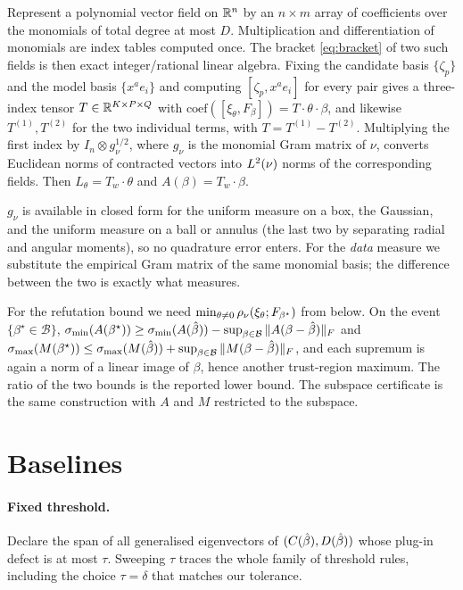 Represent a polynomial vector field on $\mathbb{R}^n$ by an $n \times m$ array of
coefficients over the monomials of total degree at most $D$. Multiplication and
differentiation of monomials are index tables computed once. The bracket
\eqref{eq:bracket} of two such fields is then exact integer/rational linear
algebra. Fixing the candidate basis $\{\zeta_p\}$ and the model basis
$\{x^a e_i\}$ and computing $[\zeta_p, x^a e_i]$ for every pair gives a
three-index tensor $T \in \mathbb{R}^{K \times P \times Q}$ with
$\mathrm{coef}([\xi_\theta,F_\beta]) = T \cdot \theta \cdot \beta$, and likewise
$T^{(1)}, T^{(2)}$ for the two individual terms, with $T = T^{(1)}-T^{(2)}$.
Multiplying the first index by $I_n \otimes g_\nu^{1/2}$, where $g_\nu$ is the
monomial Gram matrix of $\nu$, converts Euclidean norms of contracted vectors
into $L^2(\nu)$ norms of the corresponding fields. Then
$L_\theta = T_w \cdot \theta$ and $A(\beta) = T_w \cdot \beta$.

$g_\nu$ is available in closed form for the uniform measure on a box, the
Gaussian, and the uniform measure on a ball or annulus (the last two by
separating radial and angular moments), so no quadrature error enters. For the
\emph{data} measure we substitute the empirical Gram matrix of the same monomial
basis; the difference between the two is exactly what 
measures.

For the refutation bound we need
$\min_{\theta \ne 0}\rho_\nu(\xi_\theta;F_{\beta^\star})$ from below.
On the event $\{\beta^\star \in \mathcal B\}$,
$\sigma_{\min}(A(\beta^\star)) \ge \sigma_{\min}(A(\hat{\beta})) -
\sup_{\beta \in \mathcal B}\|A(\beta - \hat{\beta})\|_F$ and
$\sigma_{\max}(M(\beta^\star)) \le \sigma_{\max}(M(\hat{\beta})) +
\sup_{\beta \in \mathcal B}\|M(\beta-\hat{\beta})\|_F$, and each supremum is again a
norm of a linear image of $\beta$, hence another trust-region maximum. The
ratio of the two bounds is the reported lower bound. The subspace certificate
is the same construction with $A$ and $M$ restricted to the subspace.

\section{Baselines}
\label{app:baselines}

\paragraph{Fixed threshold.} Declare the span of all generalised eigenvectors of
$(C(\hat{\beta}), D(\hat{\beta}))$ whose plug-in defect is at most $\tau$. Sweeping $\tau$
traces the whole family of threshold rules, including the choice $\tau = \delta$
that matches our tolerance.

